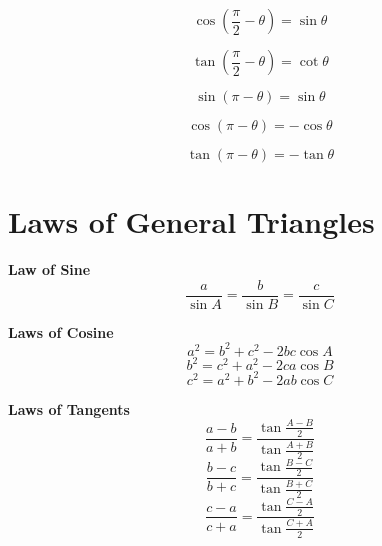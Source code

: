 \documentclass[a4paper]{book}
\begin{document}
\begin{description}
\item \begin{equation} \cos(\frac{\pi}{2} - \theta) = \sin \theta \end{equation}
\item \begin{equation} \tan(\frac{\pi}{2} - \theta) = \cot \theta \end{equation}
\item \begin{equation} \sin(\pi - \theta) = \sin \theta \end{equation}
\item \begin{equation} \cos(\pi - \theta) = -\cos \theta \end{equation}
\item \begin{equation} \tan(\pi - \theta) = -\tan \theta \end{equation}
\end{description}

\section{Laws of General Triangles}

\setlength\fboxrule{0pt}

\textbf{Law of Sine}
\begin{equation}
\frac{a}{\sin A} = \frac{b}{\sin B} = \frac{c}{\sin C}
\end{equation}

\textbf{Laws of Cosine}
\begin{equation}
a^2 = b^2 + c^2 - 2bc\cos A
\end{equation}
\begin{equation}
b^2 = c^2 + a^2 - 2ca\cos B
\end{equation}
\begin{equation}
c^2 = a^2 + b^2 - 2ab\cos C
\end{equation}

\textbf{Laws of Tangents}
\begin{equation}
\frac{a - b}{a + b} = \frac{\tan \frac{A - B}{2}}{\tan \frac{A + B}{2}}
\end{equation}
\begin{equation}
\frac{b - c}{b + c} = \frac{\tan \frac{B - C}{2}}{\tan \frac{B + C}{2}}
\end{equation}
\begin{equation}
\frac{c - a}{c + a} = \frac{\tan \frac{C - A}{2}}{\tan \frac{C + A}{2}}
\end{equation}
\end{document}

